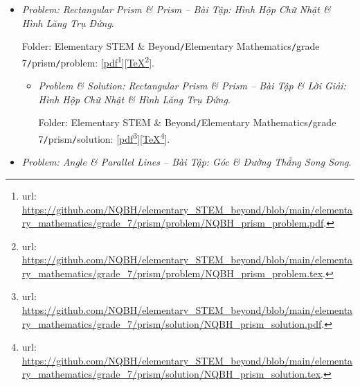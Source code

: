 \documentclass[12pt]{article}
\begin{document}
\begin{itemize}
\begin{itemize}
		Folder: {\sf Elementary STEM \& Beyond{\tt/}Elementary Mathematics{\tt/}grade 7{\tt/}real{\tt/}solution}: [\href{https://github.com/NQBH/elementary_STEM_beyond/blob/main/elementary_mathematics/grade_7/real/problem/NQBH_real_solution.pdf}{pdf}\footnote{{\sc url}: \url{https://github.com/NQBH/elementary_STEM_beyond/blob/main/elementary_mathematics/grade_7/real/problem/NQBH_real_solution.pdf}.}][\href{https://github.com/NQBH/elementary_STEM_beyond/blob/main/elementary_mathematics/grade_7/real/problem/NQBH_real_solution.tex}{\TeX}\footnote{{\sc url}: \url{https://github.com/NQBH/elementary_STEM_beyond/blob/main/elementary_mathematics/grade_7/real/problem/NQBH_real_solution.tex}.}].
	\end{itemize}
	\item {\it Problem: Rectangular Prism \& Prism -- Bài Tập: Hình Hộp Chữ Nhật \& Hình Lăng Trụ Đứng}.
	
	Folder: {\sf Elementary STEM \& Beyond{\tt/}Elementary Mathematics{\tt/}grade 7{\tt/}prism{\tt/}problem}: [\href{https://github.com/NQBH/elementary_STEM_beyond/blob/main/elementary_mathematics/grade_7/prism/problem/NQBH_prism_problem.pdf}{pdf}\footnote{{\sc url}: \url{https://github.com/NQBH/elementary_STEM_beyond/blob/main/elementary_mathematics/grade_7/prism/problem/NQBH_prism_problem.pdf}.}][\href{https://github.com/NQBH/elementary_STEM_beyond/blob/main/elementary_mathematics/grade_7/prism/problem/NQBH_prism_problem.tex}{\TeX}\footnote{{\sc url}: \url{https://github.com/NQBH/elementary_STEM_beyond/blob/main/elementary_mathematics/grade_7/prism/problem/NQBH_prism_problem.tex}.}].
	\begin{itemize}
		\item {\it Problem \& Solution: Rectangular Prism \& Prism -- Bài Tập \& Lời Giải: Hình Hộp Chữ Nhật \& Hình Lăng Trụ Đứng}.
		
		Folder: {\sf Elementary STEM \& Beyond{\tt/}Elementary Mathematics{\tt/}grade 7{\tt/}prism{\tt/}solution}: [\href{https://github.com/NQBH/elementary_STEM_beyond/blob/main/elementary_mathematics/grade_7/prism/solution/NQBH_prism_solution.pdf}{pdf}\footnote{{\sc url}: \url{https://github.com/NQBH/elementary_STEM_beyond/blob/main/elementary_mathematics/grade_7/prism/solution/NQBH_prism_solution.pdf}.}][\href{https://github.com/NQBH/elementary_STEM_beyond/blob/main/elementary_mathematics/grade_7/prism/solution/NQBH_prism_solution.tex}{\TeX}\footnote{{\sc url}: \url{https://github.com/NQBH/elementary_STEM_beyond/blob/main/elementary_mathematics/grade_7/prism/solution/NQBH_prism_solution.tex}.}].
	\end{itemize}
	\item {\it Problem: Angle \& Parallel Lines -- Bài Tập: Góc \& Đường Thẳng Song Song}.
	

\end{itemize}
\end{document}
